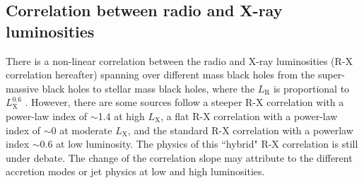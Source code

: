 \documentclass[twocolumn]{aastex63}
\begin{document}
\subsection{Correlation between radio and X-ray luminosities}
There is a non-linear correlation between the radio and X-ray luminosities (R-X correlation hereafter) spanning over different mass black holes from the super-massive black holes to stellar mass black holes, where the $L_\mathrm{R}$ is proportional to $L_\mathrm{X}^{0.6}$ \citep{2003MNRAS.345.1057M,2004A&A...414..895F}. However, there are some sources follow a steeper R-X correlation with a power-law index of $\sim$1.4 at high $L_\mathrm{X}$, a flat R-X correlation with a power-law index of  $\sim$0 at moderate $L_\mathrm{X}$, and the standard R-X correlation with a powerlaw index $\sim$0.6 \cite[e.g. ][]{2011MNRAS.414..677C,2016MNRAS.463.2287X} at low luminosity. The physics of this ``hybrid" R-X correlation is still under debate. The change of the correlation slope may attribute to the different accretion modes or jet physics at low and high luminosities\citep{2016MNRAS.456.4377X,2018MNRAS.481.4513I,2018MNRAS.473.4122E}. 
\end{document}
